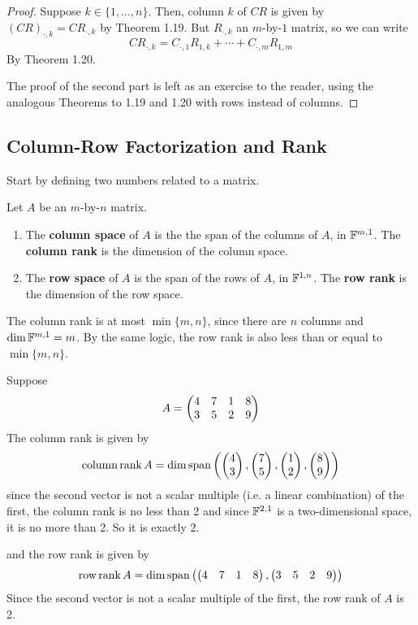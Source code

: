 \begin{proof}
    Suppose $k\in \{1, \dots, n\}$. Then, column $k$ of $CR$ is given by $(CR)_{\cdot, k} = CR_{\cdot, k}$ by Theorem 1.19. But $R_{\cdot, k}$ an $m$-by-$1$ matrix, so we can write
    \[ CR_{\cdot, k} = C_{\cdot, 1}R_{1,k} + \cdots + C_{\cdot, m}R_{1,m}\]
    By Theorem 1.20.

    The proof of the second part is left as an exercise to the reader, using the analogous Theorems to 1.19 and 1.20 with rows instead of columns.
\end{proof}
\subsection*{Column-Row Factorization and Rank}
Start by defining two numbers related to a matrix.
\begin{definition}
Let $A$ be an $m$-by-$n$ matrix.
    \begin{enumerate}
        \item The \textbf{column space} of $A$ is the the span of the columns of $A$, in $\mathbb F^{m,1}$. The \textbf{column rank} is the dimension of the column space.
        \item The \textbf{row space} of $A$ is the span of the rows of $A$, in $\mathbb F^{1, n}$. The \textbf{row rank} is the dimension of the row space. 
    \end{enumerate}
    The column rank is at most $\min\{m,n\}$, since there are $n$ columns and $\dim\mathbb F^{m,1} = m$. By the same logic, the row rank is also less than or equal to $\min\{m,n\}$.  
\end{definition}
\begin{example}
    Suppose 
    \[ A = \begin{pmatrix}4 & 7 & 1 & 8 \\ 3 & 5 & 2 & 9\end{pmatrix}\]
    The column rank is given by
    \[ \crank A = \dim\spn\pqty{\pmat{4 \\ 3}, \pmat{7 \\ 5}, \pmat{1 \\2}, \pmat{8 \\ 9}}\]
    since the second vector is not a scalar multiple (i.e. a linear combination) of the first, the column rank is no less than 2 and since $\mathbb F^{2,1}$ is a two-dimensional space, it is no more than 2. So it is exactly 2. 
    
    and the row rank is given by
    \[ \rrank A = \dim\spn\pqty{\pmat{4 & 7 & 1 & 8}, \pmat{3 & 5 & 2 & 9}}\]
    Since the second vector is not a scalar multiple of the first, the row rank of $A$ is 2.
\end{example}
